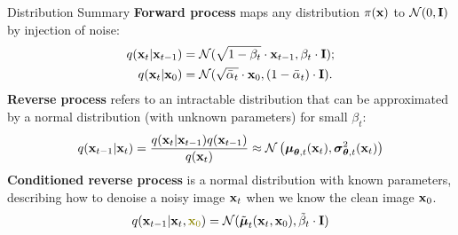 \documentclass{beamer}
\begin{document}
\begin{frame}{Distribution Summary}
    \textbf{Forward process} maps any distribution $\pi(\mathbf{x})$ to $\mathcal{N}(0, \mathbf{I})$ by injection of noise:
    \begin{align*}
        q(\mathbf{x}_t | \mathbf{x}_{t-1}) &= \mathcal{N}(\sqrt{1 - \beta_t} \cdot \mathbf{x}_{t-1}, \beta_t \cdot \mathbf{I}); \\
        q(\mathbf{x}_t | \mathbf{x}_0) &= \mathcal{N}(\sqrt{\bar{\alpha}_t} \cdot \mathbf{x}_0, (1 - \bar{\alpha}_t) \cdot \mathbf{I}).
    \end{align*}
    \textbf{Reverse process} refers to an intractable distribution that can be approximated by a normal distribution (with unknown parameters) for small $\beta_t$:
    \[
        q(\mathbf{x}_{t-1}|\mathbf{x}_{t}) = \frac{q(\mathbf{x}_{t}|\mathbf{x}_{t-1}) q(\mathbf{x}_{t-1})}{q(\mathbf{x}_{t})} \approx \mathcal{N} \left(\boldsymbol{\mu}_{\boldsymbol{\theta}, t}(\mathbf{x}_t), \boldsymbol{\sigma}_{\boldsymbol{\theta}, t}^2(\mathbf{x}_t)\right)
    \]
    \textbf{Conditioned reverse process} is a normal distribution with known parameters, describing how to denoise a noisy image $\mathbf{x}_t$ when we know the clean image $\mathbf{x}_0$.
    \[
        q(\bx_{t-1}|\bx_{t}, {\color{olive}\bx_0}) = \cN(\tilde{\bmu}_t(\bx_t, \bx_0), \tilde{\beta}_t \cdot \bI)
    \]
\end{frame}
\end{document}
